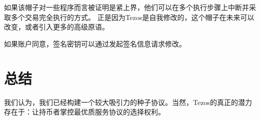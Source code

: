 \documentclass[letterpaper]{article}
\begin{document}
如果该帽子对一些程序而言被证明是紧上界，他们可以在多个执行步骤上中断并采取多个交易完全执行的方式。
正是因为Tezos是自我修改的，这个帽子在未来可以改变，或者引入更多的高级原语。

如果账户同意，签名密钥可以通过发起签名信息请求修改。

\section{总结}
我们认为，我们已经构建一个较大吸引力的种子协议。当然，Tezos的真正的潜力存在于：让持币者掌控最优质服务协议的选择权利。



\end{document}
